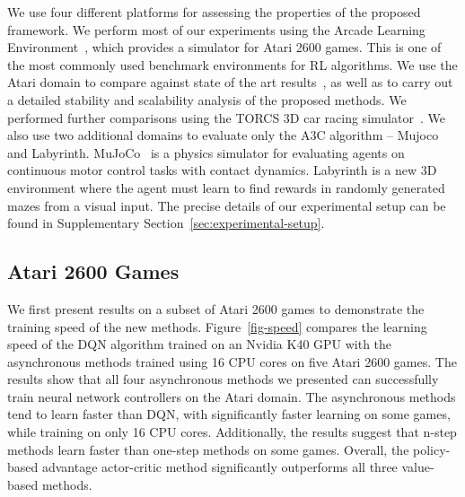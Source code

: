 \documentclass{article} %
\begin{document}
%
%
We use four different platforms for assessing the properties of the proposed framework.
We perform most of our experiments using the Arcade Learning Environment~\citep{bellemare-ale}, which provides a simulator for Atari 2600 games.
This is one of the most commonly used benchmark environments for RL algorithms.
We use the Atari domain to 
compare against state of the art results~\cite{hado2015doubledqn,wang2015dueling,schaul2015prioritized,nair2015gorila,mnih-dqn-2015},
as well as to carry out a detailed stability and scalability analysis of the proposed methods.
We performed further comparisons using the TORCS 3D car racing simulator~\citep{wymann-torcs}.
%
%
We also use two additional domains to evaluate only the A3C algorithm -- Mujoco and Labyrinth.  MuJoCo~\citep{todorov-mujoco} is a physics simulator for evaluating agents on continuous motor control tasks with contact dynamics.
Labyrinth is a new 3D environment where the agent must learn to find rewards in randomly generated mazes from a visual input.
The precise details of our experimental setup can be found in Supplementary Section~\ref{sec:experimental-setup}. 
%

%

\subsection{Atari 2600 Games}

We first present results on a subset of Atari 2600 games to demonstrate the training speed of the new methods.
Figure~\ref{fig-speed} compares the learning speed of the DQN algorithm trained on an Nvidia K40 GPU with the asynchronous methods trained using 16 CPU cores on five Atari 2600 games.
The results show that all four asynchronous methods we presented can successfully train neural network controllers on the Atari domain.
The asynchronous methods tend to learn faster than DQN, with significantly faster learning on some games, while training on only 16 CPU cores.
Additionally, the results suggest that n-step methods learn faster than one-step methods on some games.
Overall, the policy-based advantage actor-critic method significantly outperforms all three value-based methods.
\end{document}
